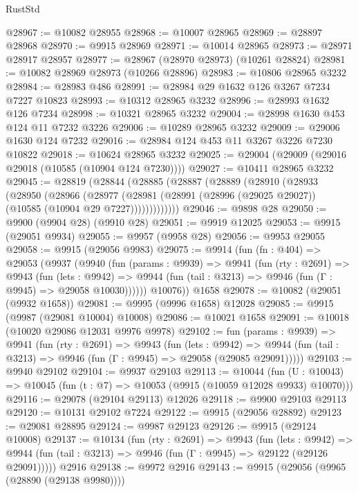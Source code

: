\begin{lexlean}{RustStd}
\begin{coremodule}
@28967 := @10082 @28955
@28968 := @10007 @28965
@28969 := @28897 @28968
@28970 := @9915 @28969
@28971 := @10014 @28965
@28973 := @28971 @28917 @28957
@28977 := @28967 (@28970 @28973) (@10261 @28824)
@28981 := @10082 @28969 @28973 (@10266 @28896)
@28983 := @10806 @28965 @3232
@28984 := @28983 @486
@28991 := @28984 @29 @1632 @126 @3267 @7234 @7227 @10823
@28993 := @10312 @28965 @3232
@28996 := @28993 @1632 @126 @7234
@28998 := @10321 @28965 @3232
@29004 := @28998 @1630 @453 @124 @11 @7232 @3226
@29006 := @10289 @28965 @3232
@29009 := @29006 @1630 @124 @7232
@29016 := @28984 @124 @453 @11 @3267 @3226 @7230 @10822
@29018 := @10624 @28965 @3232
@29025 := @29004 (@29009 (@29016 @29018 (@10585 (@10904 @124 @7230))))
@29027 := @10411 @28965 @3232
@29045 := @28819
    (@28844
      (@28885
        (@28887
          (@28889
            (@28910
              (@28933
                (@28950
                  (@28966
                    (@28977
                      (@28981
                        (@28991 (@28996 (@29025 @29027)) (@10585 (@10904 @29 @7227)))))))))))))
@29046 := @9898 @28
@29050 := @9900 (@9904 @28) (@9910 @28)
@29051 := @9919 @12025
@29053 := @9915 (@29051 @9934)
@29055 := @9957 (@9958 @28)
@29056 := @9953 @29055
@29058 := @9915 (@29056 @9983)
@29075 := @9914
    (fun (fn : @404) =>
    @29053
      (@9937
        (@9940
          (fun (params : @9939) =>
          @9941
            (fun (rty : @2691) =>
            @9943
              (fun (lets : @9942) =>
              @9944 (fun (tail : @3213) => @9946 (fun (Γ : @9945) => @29058 @10030))))))
        @10076))
    @1658
@29078 := @10082 (@29051 (@9932 @1658))
@29081 := @9995 (@9996 @1658) @12028
@29085 := @9915 (@9987 (@29081 @10004) @10008)
@29086 := @10021 @1658
@29091 := @10018 (@10020 @29086 @12031 @9976 @9978)
@29102 := fun (params : @9939) =>
  @9941
    (fun (rty : @2691) =>
    @9943
      (fun (lets : @9942) =>
      @9944 (fun (tail : @3213) => @9946 (fun (Γ : @9945) => @29058 (@29085 @29091)))))
@29103 := @9940 @29102
@29104 := @9937 @29103
@29113 := @10044
    (fun (U : @10043) => @10045 (fun (t : @7) => @10053 (@9915 (@10059 @12028 @9933) @10070)))
@29116 := @29078 (@29104 @29113) @12026
@29118 := @9900 @29103 @29113
@29120 := @10131 @29102 @7224
@29122 := @9915 (@29056 @28892)
@29123 := @29081 @28895
@29124 := @9987 @29123
@29126 := @9915 (@29124 @10008)
@29137 := @10134
    (fun (rty : @2691) =>
    @9943
      (fun (lets : @9942) =>
      @9944 (fun (tail : @3213) => @9946 (fun (Γ : @9945) => @29122 (@29126 @29091)))))
    @2916
@29138 := @9972 @2916
@29143 := @9915 (@29056 (@9965 (@28890 (@29138 @9980))))

\end{coremodule}
\end{lexlean}
